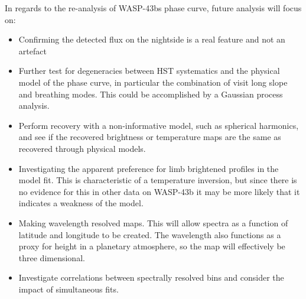 \documentclass[a4paper,fleqn,usenatbib]{mnras}
\begin{document}
In regards to the re-analysis of WASP-43bs phase curve, future analysis will focus on:

\begin{itemize}
\item Confirming the detected flux on the nightside is a real feature and not an artefact
\item Further test for degeneracies between HST systematics and the physical model of the phase curve, in particular the combination of visit long slope and breathing modes. This could be accomplished by a Gaussian process analysis.
\item Perform recovery with a non-informative model, such as spherical harmonics, and see if the recovered brightness or temperature maps are the same as recovered through physical models.
\item Investigating the apparent preference for limb brightened profiles in the model fit. This is characteristic of a temperature inversion, but since there is no evidence for this in other data on WASP-43b it may be more likely that it indicates a weakness of the model.
\item Making wavelength resolved maps. This will allow spectra as a function of latitude and longitude to be created. The wavelength also functions as a proxy for height in a planetary atmosphere, so the map will effectively be three dimensional.
\item Investigate correlations between spectrally resolved bins and consider the impact of simultaneous fits.
\end{itemize}
\end{document}
